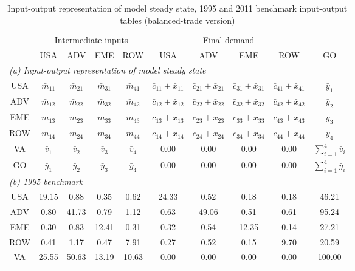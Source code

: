 \begin{table}[p]
\begin{center}
\caption{Input-output representation of model steady state, 1995 and 2011 benchmark input-output tables (balanced-trade version)}
\label{tab:iomat-bench}
\small
\begin{tabular}{cccccccccc}
\toprule
& \multicolumn{4}{c}{Intermediate inputs}& \multicolumn{4}{c}{Final demand} & \\
\cmidrule(rl){2-5}\cmidrule(rl){6-9}
 &USA &ADV &EME &ROW &USA &ADV &EME &ROW& GO\\
\midrule
\multicolumn{10}{l}{\textit{(a) Input-output representation of model steady state}} \\
USA& $\bar{m}_{11}$  & $\bar{m}_{21}$  & $\bar{m}_{31}$ & $\bar{m}_{41}$ & $\bar{c}_{11}+\bar{x}_{11}$ & $\bar{c}_{21}+\bar{x}_{21}$ & $\bar{c}_{31}+\bar{x}_{31}$ & $\bar{c}_{41}+\bar{x}_{41}$ & $\bar{y}_1$ \\
ADV& $\bar{m}_{12}$  & $\bar{m}_{22}$  & $\bar{m}_{32}$ & $\bar{m}_{42}$ & $\bar{c}_{12}+\bar{x}_{12}$ & $\bar{c}_{22}+\bar{x}_{22}$ & $\bar{c}_{32}+\bar{x}_{32}$ & $\bar{c}_{42}+\bar{x}_{42}$ & $\bar{y}_2$ \\
EME& $\bar{m}_{13}$  & $\bar{m}_{23}$  & $\bar{m}_{33}$ & $\bar{m}_{43}$ & $\bar{c}_{13}+\bar{x}_{13}$ & $\bar{c}_{23}+\bar{x}_{23}$ & $\bar{c}_{33}+\bar{x}_{33}$ & $\bar{c}_{43}+\bar{x}_{43}$ & $\bar{y}_3$ \\
ROW& $\bar{m}_{14}$  & $\bar{m}_{24}$  & $\bar{m}_{34}$ & $\bar{m}_{44}$ & $\bar{c}_{14}+\bar{x}_{14}$ & $\bar{c}_{24}+\bar{x}_{24}$ & $\bar{c}_{34}+\bar{x}_{34}$ & $\bar{c}_{44}+\bar{x}_{44}$ & $\bar{y}_4$ \\
VA& $\bar{v}_1$ & $\bar{v}_2$ & $\bar{v}_3$ & $\bar{v}_4$ & 0.00& 0.00& 0.00& 0.00& $\sum_{i=1}^4 \bar{v}_i$ \\
GO& $\bar{y}_1$ & $\bar{y}_2$ & $\bar{y}_3$ & $\bar{y}_4$ & 0.00& 0.00& 0.00& 0.00& $\sum_{i=1}^4 \bar{y}_i$ \\
\midrule
\multicolumn{10}{l}{\textit{(b) 1995 benchmark}} \\
USA& 19.15& 0.88& 0.35& 0.62& 24.33& 0.52& 0.18& 0.18& 46.21 \\
ADV& 0.80& 41.73& 0.79& 1.12& 0.63& 49.06& 0.51& 0.61& 95.24 \\
EME& 0.30& 0.83& 12.41& 0.31& 0.32& 0.54& 12.35& 0.14& 27.21 \\
ROW& 0.41& 1.17& 0.47& 7.91& 0.27& 0.52& 0.15& 9.70& 20.59 \\
VA& 25.55& 50.63& 13.19& 10.63& 0.00& 0.00& 0.00& 0.00& 100.00\\

\end{tabular}
\end{center}
\end{table}
